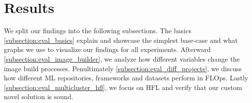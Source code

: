 \section{Results}

We split our findings into the following subsections.
The basics \ref{subsection:eval_basics} explain and showcase the simplest base-case and what graphs we use to visualize our findings for all experiments.
Afterward \ref{subsection:eval_image_builder}, we analyze how different variables change the image build processes.
Penultimately \ref{subsection:eval_diff_projects}, we discuss how different ML repositories, frameworks and datasets perform in FLOps.
Lastly \ref{subsection:eval_multicluster_hfl}, we focus on HFL and verify that our custom novel solution is sound.







